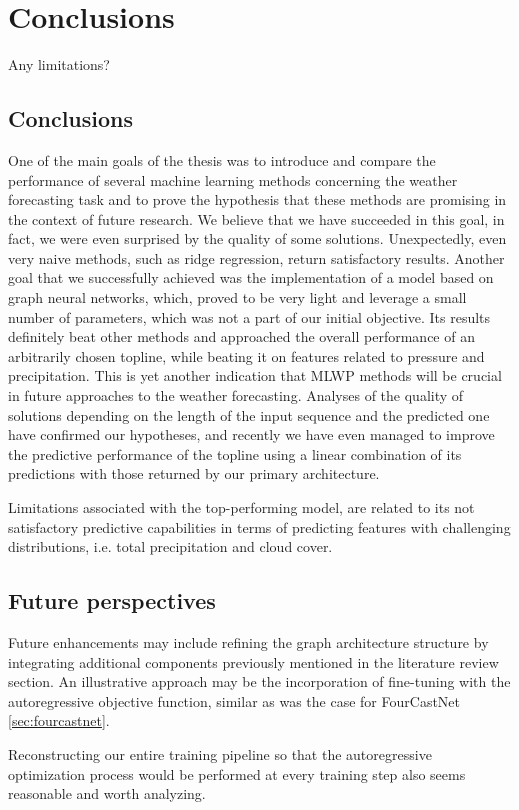 \chapter{Conclusions}
Any limitations?
\section{Conclusions}
One of the main goals of the thesis was to introduce and compare the performance of several machine learning methods concerning the weather forecasting task and to prove the hypothesis that these methods are promising in the context of future research. We believe that we have succeeded in this goal, in fact, we were even surprised by the quality of some solutions. Unexpectedly, even very naive methods, such as ridge regression, return satisfactory results. Another goal that we successfully achieved was the implementation of a model based on graph neural networks, which, proved to be very light and leverage a small number of parameters, which was not a part of our initial objective. Its results definitely beat other methods and approached the overall performance of an arbitrarily chosen topline, while beating it on features related to pressure and precipitation. This is yet another indication that MLWP methods will be crucial in future approaches to the weather forecasting. Analyses of the quality of solutions depending on the length of the input sequence and the predicted one have confirmed our hypotheses, and recently we have even managed to improve the predictive performance of the topline using a linear combination of its predictions with those returned by our primary architecture.

Limitations associated with the top-performing model, are related to its not satisfactory predictive capabilities in terms of predicting features with challenging distributions, i.e. total precipitation and cloud cover.

\section{Future perspectives}
Future enhancements may include refining the graph architecture structure by integrating additional components previously mentioned in the literature review section. An illustrative approach may be the incorporation of fine-tuning with the autoregressive objective function, similar as was the case for FourCastNet \ref{sec:fourcastnet}. 


Reconstructing our entire training pipeline so that the autoregressive optimization process would be performed at every training step also seems reasonable and worth analyzing. 


